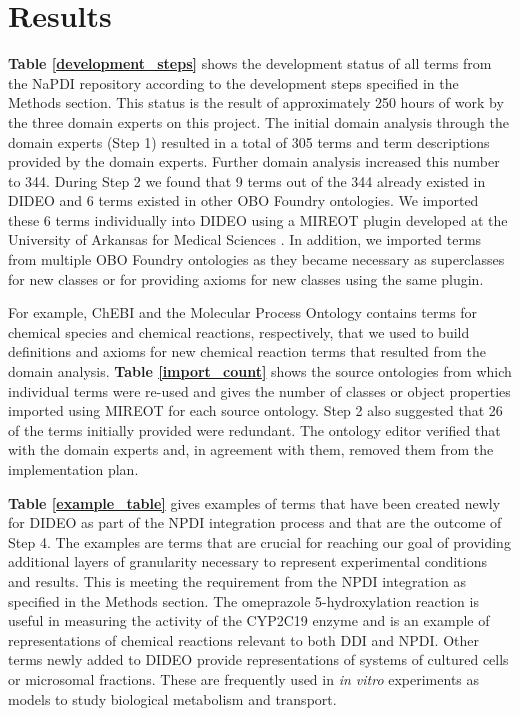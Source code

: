 \documentclass{bmcart}
\begin{document}
\section*{Results}

\textbf{Table \ref{development_steps}} shows the development status of all terms from the NaPDI repository according to the development steps specified in the Methods section.
This status is the result of approximately 250 hours of work by the three domain experts on this project.
The initial domain analysis through the domain experts (Step 1) resulted in a total of 305 terms and term descriptions provided by the domain experts.
Further domain analysis increased this number to 344.
During Step 2 we found that 9 terms out of the 344 already existed in DIDEO and 6 terms existed in other OBO Foundry ontologies.
We imported these 6 terms individually into DIDEO using a MIREOT plugin developed at the University of Arkansas for Medical Sciences \cite{Hanna2012}.
In addition, we imported terms from multiple OBO Foundry ontologies as they became necessary as superclasses for new classes or for providing axioms for new classes using the same plugin.

For example, ChEBI and the Molecular Process Ontology contains terms for chemical species and chemical reactions, respectively, that we used to build definitions and axioms for new chemical reaction terms that resulted from the domain analysis.
\textbf{Table \ref{import_count}} shows the source ontologies from which individual terms were re-used and gives the number of classes or object properties imported using MIREOT for each source ontology.
Step 2 also suggested that 26 of the terms initially provided were redundant.
The ontology editor verified that with the domain experts and, in agreement with them, removed them from the implementation plan.

\textbf{Table \ref{example_table}} gives examples of terms that have been created newly for DIDEO as part of the NPDI integration process and that are the outcome of Step 4.
The examples are terms that are crucial for reaching our goal of providing additional layers of granularity necessary to represent experimental conditions and results.
This is meeting the requirement from the NPDI integration as specified in the Methods section.
The omeprazole 5-hydroxylation reaction is useful in measuring the activity of the CYP2C19 enzyme \cite{Karam} and is an example of representations of chemical reactions relevant to both DDI and NPDI.
Other terms newly added to DIDEO provide representations of systems of cultured cells or microsomal fractions.
These are frequently used in \textit{in vitro} experiments as models to study biological metabolism and transport.
\end{document}
